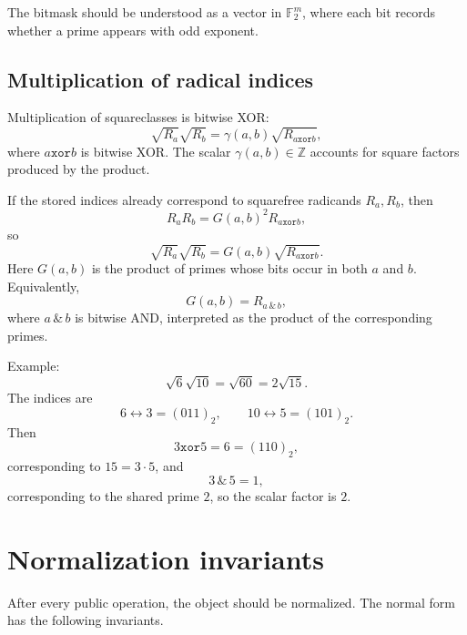 \documentclass[11pt]{article}
\newcommand{\ZZ}{\mathbb{Z}}
\newcommand{\FF}{\mathbb{F}}
\newcommand{\xor}{\mathbin{\mathtt{xor}}}
\begin{document}
The bitmask should be understood as a vector in \(\FF_2^m\), where each bit records whether a prime appears with odd exponent.

\subsection{Multiplication of radical indices}

Multiplication of squareclasses is bitwise XOR:
\begin{equation}
  \sqrt{R_a}\sqrt{R_b}
  = \gamma(a,b)\sqrt{R_{a\xor b}},
\end{equation}
where \(a\xor b\) is bitwise XOR. The scalar \(\gamma(a,b)\in \ZZ\) accounts for square factors produced by the product.

If the stored indices already correspond to squarefree radicands \(R_a,R_b\), then
\begin{equation}
  R_aR_b = G(a,b)^2 R_{a\xor b},
\end{equation}
so
\begin{equation}
  \sqrt{R_a}\sqrt{R_b}=G(a,b)\sqrt{R_{a\xor b}}.
\end{equation}
Here \(G(a,b)\) is the product of primes whose bits occur in both \(a\) and \(b\). Equivalently,
\begin{equation}
  G(a,b)=R_{a\,\&\,b},
\end{equation}
where \(a\,\&\,b\) is bitwise AND, interpreted as the product of the corresponding primes.

Example:
\begin{equation}
  \sqrt{6}\sqrt{10}
  = \sqrt{60}
  = 2\sqrt{15}.
\end{equation}
The indices are
\[
  6\leftrightarrow 3=(011)_2, \qquad 10\leftrightarrow 5=(101)_2.
\]
Then
\[
  3\xor 5 = 6=(110)_2,
\]
corresponding to \(15=3\cdot5\), and
\[
  3\,\&\,5 = 1,
\]
corresponding to the shared prime \(2\), so the scalar factor is \(2\).

\section{Normalization invariants}

After every public operation, the object should be normalized. The normal form has the following invariants.
\end{document}
